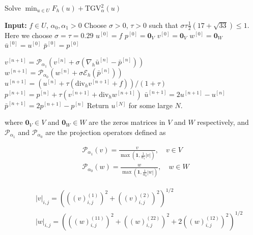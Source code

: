 \documentclass{article}
\begin{document}
\begin{algorithm}[H]
    \caption{Solve $\min_{u \in U} F_h(u) + \mathrm{TGV}^2_{\alpha}(u)$}

    \begin{algorithmic}[1]
    \STATE \textbf{Input:} $f \in U$, $\alpha_0, \alpha_1 > 0$
    \STATE Choose $\sigma > 0$, $\tau > 0$ such that $\sigma \tau \frac{1}{2} (17 + \sqrt{33}) \leq 1$. Here we choose $\sigma = \tau = 0.29$
    \STATE $u^{[0]} = f$
    \STATE $p^{[0]} = \mathbf{0}_V$
    \STATE $v^{[0]} = \mathbf{0}_V$
    \STATE $w^{[0]} = \mathbf{0}_W$
    \STATE $\bar{u}^{[0]} = u^{[0]}$
    \STATE $\bar{p}^{[0]} = p^{[0]}$

            \STATE $v^{[n+1]} = \mathcal{P}_{\alpha_1} \left( v^{[n]} + \sigma (\nabla_h \bar{u}^{[n]} - \bar{p}^{[n]}) \right)$
            \STATE $w^{[n+1]} = \mathcal{P}_{\alpha_0} \left( w^{[n]} + \sigma \mathcal{E}_h (\bar{p}^{[n]}) \right)$
            \STATE $u^{[n+1]} = \left( u^{[n]} + \tau (\text{div}_h v^{[n+1]} + f) \right) / ( 1 + \tau )$
            \STATE $p^{[n+1]} = p^{[n]} + \tau (v^{[n+1]} + \text{div}_h w^{[n+1]})$
            \STATE $\bar{u}^{[n+1]} = 2u^{[n+1]} - u^{[n]}$
            \STATE $\bar{p}^{[n+1]} = 2p^{[n+1]} - p^{[n]}$
    \ENDFOR
    \STATE Return $u^{[N]}$ for some large $N$.

    \end{algorithmic}
    \label{alg:pdhg}
\end{algorithm}

where $\mathbf{0}_V \in V$ and $\mathbf{0}_W \in W$ are the zeros matrices in $V$ and $W$ respectively, and $\mathcal{P}_{\alpha_1}$ and $\mathcal{P}_{\alpha_0}$ are the projection operators defined as

\begin{equation}
    \begin{aligned}
    & \mathcal{P}_{\alpha_1}(v) = \frac{v}{\max \left(\mathbf{1}, \frac{1}{\alpha_1}|v|\right)}, \quad v \in V \\
    & \mathcal{P}_{\alpha_0}(w) = \frac{w}{\max \left(\mathbf{1}, \frac{1}{\alpha_0}|w|\right)}, \quad w \in W
    \end{aligned}
\end{equation}



\begin{equation}
    \begin{aligned}
   \quad &|v|_{i,j} = \left( \left( (v)_{i,j}^{(1)} \right)^{2} + \left( (v)_{i,j}^{(2)} \right)^{2} \right)^{1/2} \\
    \quad &|w|_{i,j} = \left( \left( (w)_{i,j}^{(11)} \right)^{2} + \left( (w)_{i,j}^{(22)} \right)^{2} + 2 \left( (w)_{i,j}^{(12)} \right)^{2} \right)^{1/2}
    \end{aligned}
\end{equation}
\end{document}

